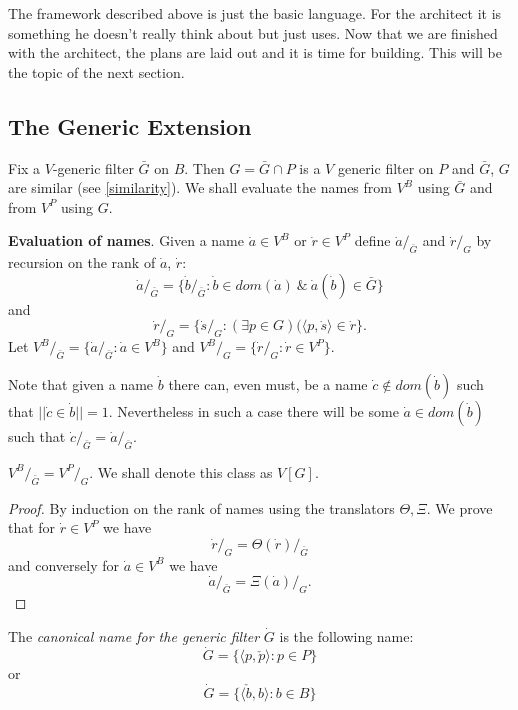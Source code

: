 The framework described above is just the basic language. For the architect it is
something he doesn't really think about but just uses. Now that we are finished with the architect,
the plans are laid out and it is time for building. This will be the topic of the next section.

\subsection{The Generic Extension}

Fix a $V$-generic filter $\bar{G}$ on $B$. Then $G=\bar{G}\cap P$ is a $V$ generic filter
on $P$ and $\bar{G}$, $G$ are similar (see \ref{similarity}). We shall evaluate the names
from $V^B$ using $\bar{G}$ and from $V^P$ using $G$.

\begin{definition}{\bf Evaluation of names}. Given a name $\dot{a}\in V^B$ or $\dot{r}\in V^P$ define
$\dot{a}/_{\bar{G}}$ and $\dot{r}/_{G}$ by recursion on the rank of $\dot{a}$, $\dot{r}$:
 $$
 \dot{a}/_{\bar{G}} =\{\dot{b}/_{\bar{G}}:\dot{b}\in dom(\dot{a})\ \&\ \dot{a}(\dot{b})\in\bar{G}\}
 $$
 and
 $$
 \dot{r}/_{G} =\{\dot{s}/_{G}:(\exists p\in G)(\langle p,\dot{s}\rangle\in\dot{r}\}.
 $$
 Let $V^B/_{\bar{G}}=\{\dot{a}/_{\bar{G}}:\dot{a}\in V^B\}$ and $V^B/_{G}=\{\dot{r}/_{G}:\dot{r}\in V^P\}$.
\end{definition}

\begin{remark} Note that given a name $\dot{b}$ there can, even must, be a name $\dot{c}\not\in dom(\dot{b})$ such
that $||\dot{c}\in\dot{b}||=1$. Nevertheless in such a case there will be some $\dot{a}\in dom(\dot{b})$ such that
$\dot{c}/_{\bar{G}} = \dot{a}/_{\bar{G}}$.
\end{remark}

\begin{fact} $V^B/_{\bar{G}}=V^P/_G$. We shall denote this class as $V[G]$.
\end{fact}
\begin{proof} By induction on the rank of names using the translators $\Theta,\Xi$. We prove that
for $\dot{r}\in V^P$ we have
$$
\dot{r}/_{G} = \Theta(\dot{r})/_{\bar{G}}
$$
and conversely for $\dot{a}\in V^B$ we have
$$
\dot{a}/_{\bar{G}} = \Xi(\dot{a})/_{G}.
$$
\end{proof}

 \begin{definition} The \emph{canonical name for the generic filter} $\dot{G}$ is the following name:
 $$
 \dot{G} =\{\langle p,\check{p}\rangle:p\in P\}
 $$
 or
 $$
 \dot{G}=\{\langle \check{b},b\rangle :b\in B\}
 $$
 \end{definition}


